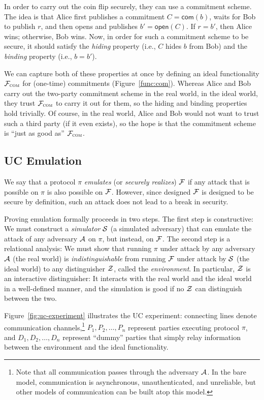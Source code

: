 In order to carry out the coin flip securely, they can use a commitment
scheme. The idea is that Alice first publishes a commitment $C =
\mathsf{com}(b)$, waits for Bob to publish $r$, and then opens and publishes $b'
= \mathsf{open}(C)$. If $r = b'$, then Alice wins; otherwise, Bob wins.  Now, in
order for such a commitment scheme to be secure, it should satisfy the
\emph{hiding} property (i.e., $C$ hides $b$ from Bob) and the \emph{binding}
property (i.e., $b=b'$).

We can capture both of these properties at once by defining an ideal
functionality $\mathcal{{F}}_{\textsc{com}}$ for (one-time) commitments
(Figure~\ref{func:com}). Whereas Alice and Bob carry out the two-party
commitment scheme in the real world, in the ideal world, they trust
$\mathcal{{F}}_{\textsc{com}}$ to carry it out for them, so the hiding and binding
properties hold trivially. Of course, in the real world, Alice and Bob would not
want to trust such a third party (if it even exists), so the hope is that the
commitment scheme is ``just as good as'' $\mathcal{{F}}_{\textsc{com}}$.

\subsection{UC Emulation}
\label{subsec:emulation}

We say that a protocol $\pi$ \emph{emulates} (or \emph{securely realizes})
$\mathcal{{F}}$ if any attack that is possible on $\pi$ is also possible on
$\mathcal{{F}}$. However, since designed $\mathcal{{F}}$ is designed to be secure by
definition, such an attack does not lead to a break in security.

Proving emulation formally proceeds in two steps. The first step is
constructive: We must construct a \emph{simulator} $\mathcal{{S}}$ (a simulated
adversary) that can emulate the attack of any adversary $\mathcal{{A}}$ on $\pi$, but
instead, on $\mathcal{{F}}$. The second step is a relational analysis: We must show
that running $\pi$ under attack by any adversary $\mathcal{{A}}$ (the real world) is
\emph{indistinguishable} from running $\mathcal{{F}}$ under attack by $\mathcal{{S}}$ (the
ideal world) to any distinguisher $\mathcal{{Z}}$, called the \emph{environment}. In
particular, $\mathcal{{Z}}$ is an interactive distinguisher: It interacts with the real
world and the ideal world in a well-defined manner, and the simulation is good
if no $\mathcal{{Z}}$ can distinguish between the two.

Figure~\ref{fig:uc-experiment} illustrates the UC experiment: connecting lines
denote communication channels,\footnote{Note that all communication passes
  through the adversary $\mathcal{{A}}$. In the bare model, communication is
  asynchronous, unauthenticated, and unreliable, but other models of
  communication can be built atop this model.} $P_1, P_2, \ldots, P_n$ represent
parties executing protocol $\pi$, and $D_1, D_2, \ldots, D_n$ represent ``dummy''
parties that simply relay information between the environment and the ideal
functionality.

